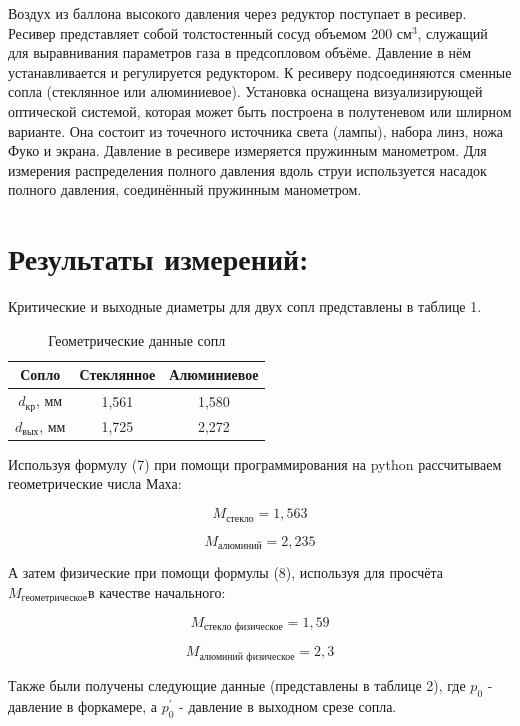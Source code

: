 \documentclass[a4paper]{article}
\begin{document}
Воздух из баллона высокого давления через редуктор поступает в ресивер. Ресивер представляет собой толстостенный сосуд объемом 200 см$^3$, служащий для выравнивания параметров газа в предсопловом объёме. Давление в нём устанавливается и регулируется редуктором. К ресиверу подсоединяются сменные сопла (стеклянное или алюминиевое). Установка оснащена визуализирующей оптической системой, которая может быть построена в полутеневом или шлирном варианте. Она состоит из точечного источника света (лампы), набора линз, ножа Фуко и экрана. Давление в ресивере измеряется пружинным манометром. Для измерения распределения полного давления вдоль струи используется насадок полного давления, соединённый пружинным манометром.




\section*{Результаты измерений:}

Критические и выходные диаметры для двух сопл представлены в таблице 1.

\begin{table}[H]
\centering
\begin{tabular}{|c||c|c|}
\hline
Сопло & Стеклянное & Алюминиевое\\ \hline
$d_\text{кр}$, мм	&1,561	&1,580   \\ \hline
$d_\text{вых}$, мм	&1,725	&2,272	 \\ \hline
\end{tabular}
\caption{Геометрические данные сопл}
\end{table}

Используя формулу (7) при помощи программирования на python рассчитываем геометрические числа Маха:

$$M_{\text{стекло}} = 1,563 $$

$$M_{\text{алюминий}} = 2,235 $$

А затем физические при помощи формулы (8), используя для просчёта $M_\text{геометрическое} $в качестве начального:

$$M_{\text{стекло физическое}} = 1,59 $$

$$M_{\text{алюминий физическое}} = 2,3 $$


Также были получены следующие данные (представлены в таблице 2), где $p_0$ - давление в форкамере, а $p_{0}^{'}$ - давление в выходном срезе сопла.
\end{document}
